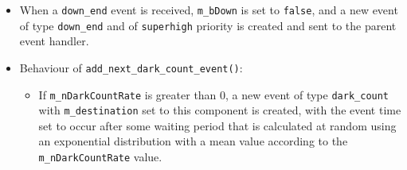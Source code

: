 \begin{itemize}
\item When a \texttt{down\_end} event is received, \texttt{m\_bDown} is set to \texttt{false}, and a new event of type \texttt{down\_end} and of \texttt{superhigh} priority is created and sent to the parent event handler.

\item Behaviour of \texttt{add\_next\_dark\_count\_event()}:

\begin{itemize}

\item If \texttt{m\_nDarkCountRate} is greater than 0, a new event of type \texttt{dark\_count} with \texttt{m\_destination} set to this component is created, with the event time set to occur after some waiting period that is calculated at random using an exponential distribution with a mean value according to the \texttt{m\_nDarkCountRate} value.

\end{itemize}

\end{itemize}

